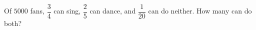 Of $5000$ fans, $\dfrac{3}{4}$ can sing, $\dfrac{2}{5}$ can dance, and $\dfrac{1}{20}$ can do neither. How many can do both?
